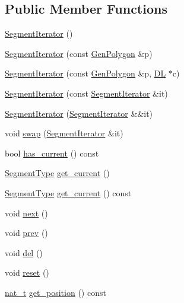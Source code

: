\subsection*{Public Member Functions}
\begin{DoxyCompactItemize}
\item 
\hyperlink{class_designar_1_1_gen_polygon_1_1_segment_iterator_a80756e8c1b97f3f92ec2096de23ffbc8}{Segment\+Iterator} ()
\item 
\hyperlink{class_designar_1_1_gen_polygon_1_1_segment_iterator_a619943832325800e2962b92c9254c026}{Segment\+Iterator} (const \hyperlink{class_designar_1_1_gen_polygon}{Gen\+Polygon} \&p)
\item 
\hyperlink{class_designar_1_1_gen_polygon_1_1_segment_iterator_a47d2a28c926e54eda4afb078e00182a0}{Segment\+Iterator} (const \hyperlink{class_designar_1_1_gen_polygon}{Gen\+Polygon} \&p, \hyperlink{class_designar_1_1_d_l}{DL} $\ast$c)
\item 
\hyperlink{class_designar_1_1_gen_polygon_1_1_segment_iterator_a5b3e9dbdf9dfdc822c42ab87b15937f6}{Segment\+Iterator} (const \hyperlink{class_designar_1_1_gen_polygon_1_1_segment_iterator}{Segment\+Iterator} \&it)
\item 
\hyperlink{class_designar_1_1_gen_polygon_1_1_segment_iterator_aeb3c590a66d1f7073b98f6aa47453b02}{Segment\+Iterator} (\hyperlink{class_designar_1_1_gen_polygon_1_1_segment_iterator}{Segment\+Iterator} \&\&it)
\item 
void \hyperlink{class_designar_1_1_gen_polygon_1_1_segment_iterator_ac4645f540700248e954fefe6ec7b5d26}{swap} (\hyperlink{class_designar_1_1_gen_polygon_1_1_segment_iterator}{Segment\+Iterator} \&it)
\item 
bool \hyperlink{class_designar_1_1_gen_polygon_1_1_segment_iterator_a5a00faaa26edbf38c59d8d578e8e7d1b}{has\+\_\+current} () const
\item 
\hyperlink{class_designar_1_1_gen_polygon_a06fe54118b31269c3fc76cc9b5e55654}{Segment\+Type} \hyperlink{class_designar_1_1_gen_polygon_1_1_segment_iterator_ac70a85f86d2ff0b55b3bfe1a495afcc3}{get\+\_\+current} ()
\item 
\hyperlink{class_designar_1_1_gen_polygon_a06fe54118b31269c3fc76cc9b5e55654}{Segment\+Type} \hyperlink{class_designar_1_1_gen_polygon_1_1_segment_iterator_ad899db34f5eb391c6ad361e7eb7b889c}{get\+\_\+current} () const
\item 
void \hyperlink{class_designar_1_1_gen_polygon_1_1_segment_iterator_a29ad4efa177e5747bbd3fb181924f452}{next} ()
\item 
void \hyperlink{class_designar_1_1_gen_polygon_1_1_segment_iterator_ae9dd9bcb49dfb8be9b81403f730e9e89}{prev} ()
\item 
void \hyperlink{class_designar_1_1_gen_polygon_1_1_segment_iterator_a1eeabdc5b01ab8a6888b9cca583e6ccd}{del} ()
\item 
void \hyperlink{class_designar_1_1_gen_polygon_1_1_segment_iterator_a6d58451abb12f9d7f813f6368c8f2f68}{reset} ()
\item 
\hyperlink{namespace_designar_aa72662848b9f4815e7bf31a7cf3e33d1}{nat\+\_\+t} \hyperlink{class_designar_1_1_gen_polygon_1_1_segment_iterator_abb850f5034a93dd4da93de11c5619de5}{get\+\_\+position} () const
\end{DoxyCompactItemize}
